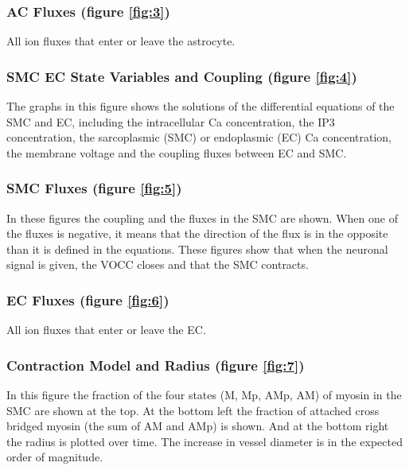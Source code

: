 	\subsubsection*{AC Fluxes (figure \ref{fig:3})}
	All ion fluxes that enter or leave the astrocyte.
	
	
	\subsubsection*{SMC EC State Variables and Coupling (figure \ref{fig:4})}
	The graphs in this figure shows the solutions of the differential equations of the \gls{SMC} and \gls{EC}, including the intracellular \gls{Ca} concentration, the \gls{IP3} concentration, the sarcoplasmic (\gls{SMC}) or endoplasmic (\gls{EC}) \gls{Ca} concentration, the membrane voltage and the coupling fluxes between EC and SMC.
	
	\subsubsection*{SMC Fluxes (figure \ref{fig:5})}
	In these figures the coupling and the fluxes in the SMC are shown. When one of the fluxes is negative, it means that the direction of the flux is in the opposite than it is defined in the equations. These figures show that when the neuronal signal is given, the VOCC closes and that the SMC contracts. 
	
	\subsubsection*{EC Fluxes (figure \ref{fig:6})}
	All ion fluxes that enter or leave the EC.
	
	\subsubsection*{Contraction Model and Radius (figure \ref{fig:7})}
	In this figure the fraction of the four states (M, Mp, AMp, AM) of myosin in the SMC are shown at the top. At the bottom left the fraction of attached cross bridged myosin (the sum of AM and AMp) is shown. And at the bottom right the radius is plotted over time. The increase in vessel diameter is in the expected order of magnitude.
	
